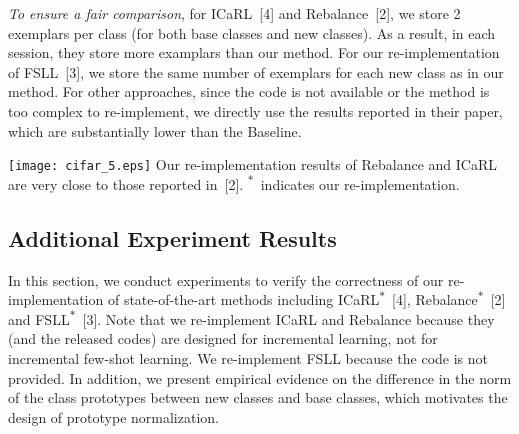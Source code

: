 \documentclass{article}
\begin{document}
\emph{To ensure a fair comparison}, for ICaRL~[4] and Rebalance~[2], we store 2 exemplars per class (for both base classes and new classes). As a result, in each session, they store more examplars than our method. For our re-implementation of FSLL~[3], we store the same number of exemplars for each new class as in our method. For other approaches, since the code is not available or the method is too complex to re-implement, we directly use the results reported in their paper, which are substantially lower than the Baseline. 

\begin{minipage}{.47\textwidth}
    \centering
    \texttt{[image: cifar\_5.eps]}
{Our re-implementation results of Rebalance and ICaRL are very close to those reported in~[2]. \textsuperscript{$\ast$}~indicates our re-implementation.}
\label{fig:cifar}
\end{minipage}
\hfill
\begin{minipage}{.47\textwidth}
\centering
  \label{table:norm}
\end{minipage}

 
\subsection{Additional Experiment Results} \label{appendix:addition_exp}
In this section, we conduct experiments to verify the correctness of our re-implementation of state-of-the-art methods including ICaRL\textsuperscript{$\ast$}~[4], Rebalance\textsuperscript{$\ast$}~[2] and FSLL\textsuperscript{$\ast$}~[3]. Note that we re-implement ICaRL and Rebalance because they (and the released codes) are designed for incremental learning, not for incremental few-shot learning. We re-implement FSLL because the code is not provided. In addition, we present empirical evidence on the difference in the norm of the class prototypes between new classes and base classes, which motivates the design of prototype normalization. 
\end{document}
